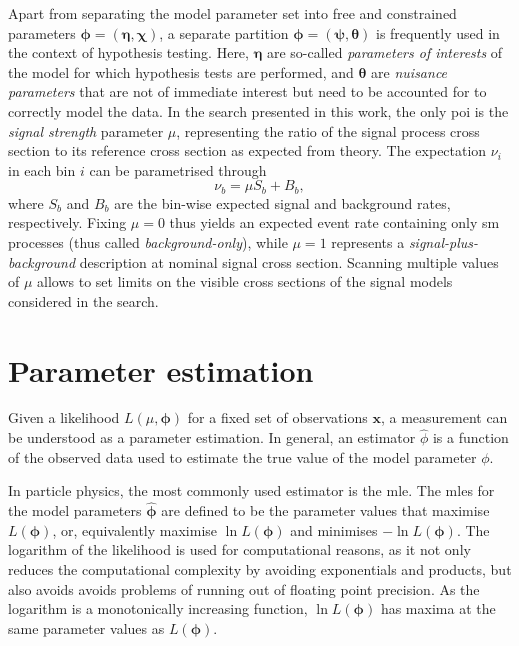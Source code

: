 Apart from separating the model parameter set into free and constrained parameters $\boldsymbol{\phi} = (\boldsymbol{\eta},\boldsymbol{\chi})$, a separate partition $\boldsymbol{\phi} = (\boldsymbol{\psi},\boldsymbol{\theta})$ is frequently used in the context of hypothesis testing. Here, $\boldsymbol{\eta}$ are so-called \textit{parameters of interests} of the model for which hypothesis tests are performed, and $\boldsymbol{\theta}$ are \textit{nuisance parameters} that are not of immediate interest but need to be accounted for to correctly model the data. In the search presented in this work, the only \gls{poi} is the \textit{signal strength} parameter $\mu$, representing the ratio of the signal process cross section to its reference cross section as expected from theory. The expectation $\nu_i$ in each bin $i$ can be parametrised through
\begin{equation}
	\nu_b = \mu S_b + B_b,
\end{equation}
where $S_b$ and $B_b$ are the bin-wise expected signal and background rates, respectively. Fixing $\mu = 0$ thus yields an expected event rate containing only \gls{sm} processes (thus called \textit{background-only}), while $\mu = 1$ represents a \textit{signal-plus-background} description at nominal signal cross section. Scanning multiple values of $\mu$ allows to set limits on the visible cross sections of the signal models considered in the search. 
  
\section{Parameter estimation}

Given a likelihood $L(\mu,\boldsymbol{\phi})$ for a fixed set of observations $\boldsymbol{x}$, a measurement can be understood as a parameter estimation. In general, an estimator $\hat{\phi}$ is a function of the observed data used to estimate the true value of the model parameter $\phi$.

In particle physics, the most commonly used estimator is the \gls{mle}. The \glspl{mle} for the model parameters $\boldsymbol{\hat{\phi}}$ are defined to be the parameter values that maximise $L(\boldsymbol{\phi})$, or, equivalently maximise $\ln{L(\boldsymbol{\phi})}$ and minimises $-\ln{L(\boldsymbol{\phi})}$. The logarithm of the likelihood is used for computational reasons, as it not only reduces the computational complexity by avoiding exponentials and products, but also avoids avoids problems of running out of floating point precision. As the logarithm is a monotonically increasing function, $\ln{L(\boldsymbol{\phi})}$ has maxima at the same parameter values as ${L(\boldsymbol{\phi})}$.

